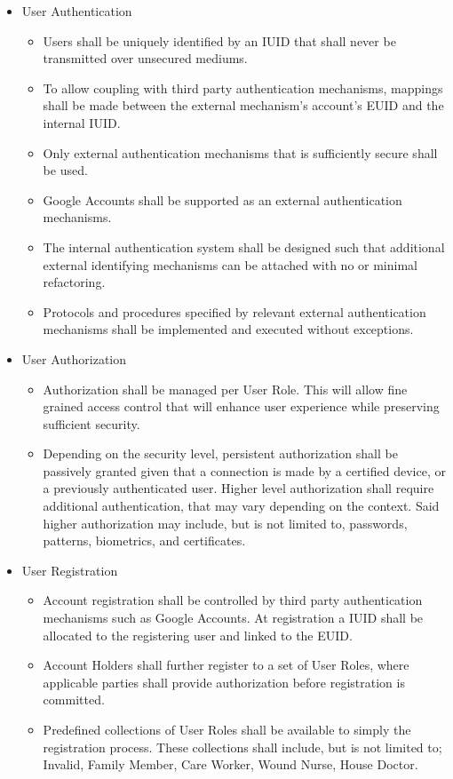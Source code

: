 \begin{itemize}
	\item{User Authentication}
	\begin{itemize}
		\item Users shall be uniquely identified by an IUID that shall never be transmitted over unsecured mediums.
		\item To allow coupling with third party authentication mechanisms, mappings shall be made between the external mechanism's account's EUID and the internal IUID.
		\item Only external authentication mechanisms that is sufficiently secure shall be used.
		\item Google Accounts shall be supported as an external authentication mechanisms.
		\item The internal authentication system shall be designed such that additional external identifying mechanisms can be attached with no or minimal refactoring.
		\item Protocols and procedures specified by relevant external authentication mechanisms shall be implemented and executed without exceptions.
	\end{itemize}
	\item{User Authorization}
	\begin{itemize}
		\item Authorization shall be managed per User Role. This will allow fine grained access control that will enhance user experience while preserving sufficient security.
		\item Depending on the security level, persistent authorization shall be passively granted given that a connection is made by a certified device, or a previously authenticated user. Higher level authorization shall require additional authentication, that may vary depending on the context. Said higher authorization may include, but is not limited to, passwords, patterns, biometrics, and certificates.
	\end{itemize}
	\item{User Registration}
	\begin{itemize}
		\item Account registration shall be controlled by third party authentication mechanisms such as Google Accounts. At registration a IUID shall be allocated to the registering user and linked to the EUID. 
		\item Account Holders shall further register to a set of User Roles, where applicable parties shall provide authorization before registration is committed.
		\item Predefined collections of User Roles shall be available to simply the registration process. These collections shall include, but is not limited to; Invalid, Family Member, Care Worker, Wound Nurse, House Doctor.
		

\end{itemize}
\end{itemize}
